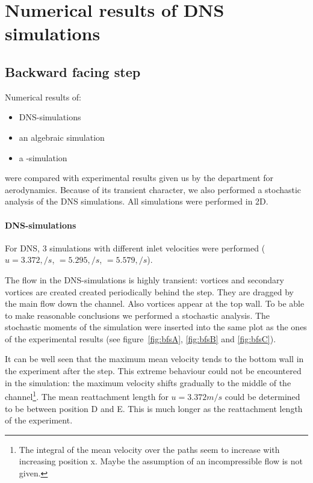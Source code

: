 \chapter{Numerical results of DNS simulations} %
\label{cha:numerical_results}

\section{Backward facing step} %
\label{sec:backward_facing_step}

Numerical results of:
\begin{itemize}
\item DNS-simulations
\item an algebraic simulation
\item a \ke-simulation
\end{itemize}
were compared with experimental results given us by the department for aerodynamics. Because of its transient character, we also performed a stochastic analysis of the DNS simulations. All simulations were performed in 2D.

\subsubsection*{DNS-simulations}

For DNS, 3 simulations with different inlet velocities were performed ($u=3.372,/s$, $=5.295,/s$, $=5.579,/s$).

\noii The flow in the DNS-simulations is highly transient: vortices and secondary vortices are created created periodically behind the step. They are dragged by the main flow down the channel. Also vortices appear at the top wall. To be able to make reasonable conclusions we performed a stochastic analysis. The stochastic moments of the simulation were inserted into the same plot as the ones of the experimental results (see figure~\ref{fig:bfsA}, \ref{fig:bfsB} and \ref{fig:bfsC}). 

\noii It can be well seen that the maximum mean velocity tends to the bottom wall in the experiment after the step. This extreme behaviour could not be encountered in the simulation: the maximum velocity shifts gradually to the middle of the channel\footnote{The integral of the mean velocity over the paths seem to increase with increasing position x. Maybe the assumption of an incompressible flow is not given.}. The mean reattachment length for $u=3.372m/s$ could be determined to be between position D and E. This is much longer as the reattachment length of the experiment.

